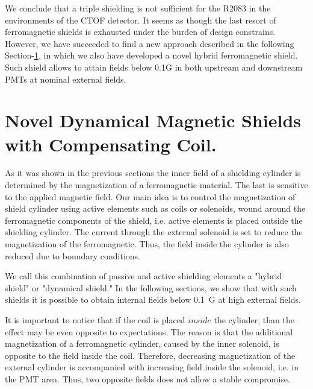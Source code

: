 \documentclass[12pt]{article}
\begin{document}
\clearpage
We conclude that  a  triple shielding  is  not  
sufficient for the R2083 in the environments of the CTOF detector.
It seems as though the last resort of ferromagnetic shields is exhausted under the
burden of design constrains.
However, we have succeeded to find a new  approach described in the 
following Section-\ref{novelle}, in which we also  
have  developed a novel  hybrid ferromagnetic shield. 
Such shield allows  to attain fields below 0.1G in both  upstream and
downstream PMTs at nominal external fields.
\pagebreak
\newpage
\section{Novel Dynamical Magnetic Shields with Compensating Coil.}
\label{novelle}
As it was shown in the previous sections the inner field of a shielding cylinder
is determined by the magnetization of a ferromagnetic material.  The last is sensitive to
the applied magnetic field.
Our main idea is to control the magnetization of shield cylinder
using active elements such as coils or solenoids, wound around the 
ferromagnetic components of the shield, i.e. active elements is placed outside the 
shielding cylinder.  The current through the external solenoid  is set to 
reduce the  magnetization of the ferromagnetic. Thus, the field inside the cylinder 
is also reduced due to  boundary conditions.

We call this combination of passive and active shielding elements a "hybrid shield" or 
"dynamical shield." In the following sections, we show that with such shields it is possible to  
obtain internal fields below 0.1~G at high external fields.

It is important to notice that if the coil is placed $inside$ the cylinder, 
than the  effect may be even opposite to expectations. The reason is that the   
additional  magnetization of a ferromagnetic cylinder,  caused by  the inner solenoid, 
is opposite to the field inside the coil. 
Therefore, decreasing magnetization of the external  cylinder is accompanied with increasing field inside the
solenoid, i.e. in the PMT area.  Thus, two opposite fields  does not allow a stable compromise.
 
\end{document}
